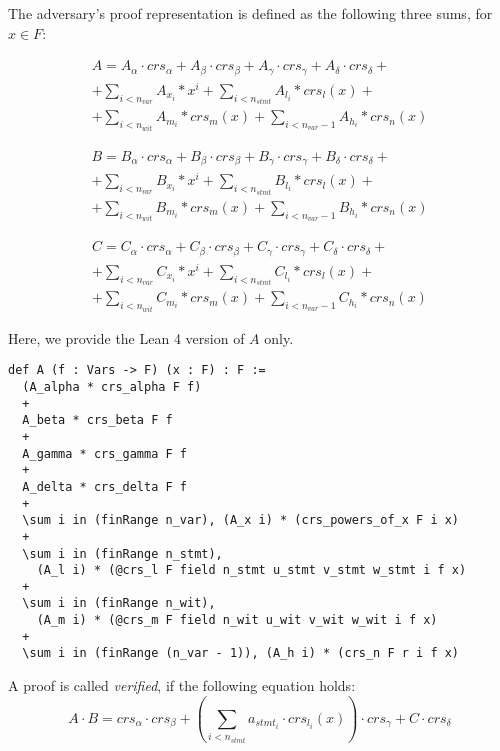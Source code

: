 \documentclass{article}
\theoremstyle{definition}
\theoremstyle{remark}
\begin{document}
The adversary's proof representation is defined as the following three sums, for $x \in F$:

\begin{multline}
A = A_{\alpha} \cdot crs_{\alpha} + A_{\beta} \cdot crs_{\beta} + A_{\gamma} \cdot crs_{\gamma} + A_{\delta} \cdot crs_{\delta} + \\
    + \sum \limits_{i < n_{var}} A_{x_i} * x^i + \sum \limits_{i < n_{stmt}} A_{l_i} * crs_l(x) + \\
    + \sum \limits_{i < n_{wit}} A_{m_i} * crs_m(x) + \sum \limits_{i < n_{var} - 1} A_{h_i} * crs_n(x)
\end{multline}

\begin{multline}
B = B_{\alpha} \cdot crs_{\alpha} + B_{\beta} \cdot crs_{\beta} + B_{\gamma} \cdot crs_{\gamma} + B_{\delta} \cdot crs_{\delta} + \\
    + \sum \limits_{i < n_{var}} B_{x_i} * x^i + \sum \limits_{i < n_{stmt}} B_{l_i} * crs_l(x) + \\
    + \sum \limits_{i < n_{wit}} B_{m_i} * crs_m(x) + \sum \limits_{i < n_{var} - 1} B_{h_i} * crs_n(x)
\end{multline}

\begin{multline}
C = C_{\alpha} \cdot crs_{\alpha} + C_{\beta} \cdot crs_{\beta} + C_{\gamma} \cdot crs_{\gamma} + C_{\delta} \cdot crs_{\delta} + \\
    + \sum \limits_{i < n_{var}} C_{x_i} * x^i + \sum \limits_{i < n_{stmt}} C_{l_i} * crs_l(x) + \\
    + \sum \limits_{i < n_{wit}} C_{m_i} * crs_m(x) + \sum \limits_{i < n_{var} - 1} C_{h_i} * crs_n(x)
\end{multline}

Here, we provide the Lean 4 version of $A$ only.

\begin{lstlisting}
def A (f : Vars -> F) (x : F) : F :=
  (A_alpha * crs_alpha F f)
  +
  A_beta * crs_beta F f
  +
  A_gamma * crs_gamma F f
  +
  A_delta * crs_delta F f
  +
  \sum i in (finRange n_var), (A_x i) * (crs_powers_of_x F i x)
  +
  \sum i in (finRange n_stmt),
    (A_l i) * (@crs_l F field n_stmt u_stmt v_stmt w_stmt i f x)
  +
  \sum i in (finRange n_wit),
    (A_m i) * (@crs_m F field n_wit u_wit v_wit w_wit i f x)
  +
  \sum i in (finRange (n_var - 1)), (A_h i) * (crs_n F r i f x)
\end{lstlisting}

A proof is called \emph{verified}, if the following equation holds:
\begin{equation}
A \cdot B = crs_{\alpha} \cdot crs_{\beta} + (\sum \limits_{i < n_{stmt}} a_{{stmt}_i} \cdot crs_{l_i}(x)) \cdot crs_{\gamma} + C \cdot crs_{\delta}
\end{equation}
\end{document}
